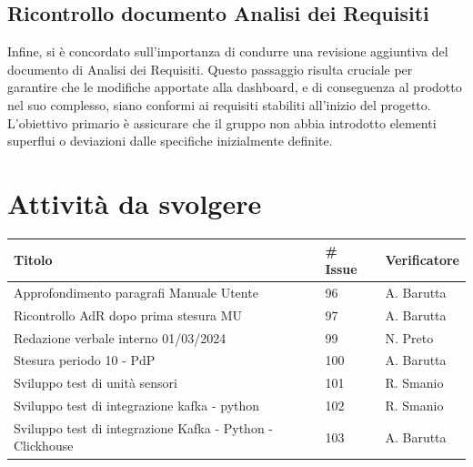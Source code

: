 \documentclass{article}
\begin{document}
    \subsection{Ricontrollo documento Analisi dei Requisiti}
    Infine, si è concordato sull'importanza di condurre una revisione aggiuntiva del documento di Analisi dei Requisiti. Questo passaggio risulta cruciale per garantire che le modifiche apportate alla dashboard, e di conseguenza al prodotto nel suo complesso, siano conformi ai requisiti stabiliti all'inizio del progetto. L'obiettivo primario è assicurare che il gruppo non abbia introdotto elementi superflui o deviazioni dalle specifiche inizialmente definite.

    \section{Attività da svolgere}
    \begin{center}
        \begin{tabular}{|C{7cm}|C{1,5cm}|C{3cm}|}
            \hline
            \textbf{Titolo} & \textbf{\# Issue} & \textbf{Verificatore} \\
            \hline
            \hline
            Approfondimento paragrafi Manuale Utente & 96 & A. Barutta \\
            \hline
            Ricontrollo AdR dopo prima stesura MU & 97 & A. Barutta \\
            \hline
            Redazione verbale interno 01/03/2024 & 99 & N. Preto \\
            \hline
            Stesura periodo 10 - PdP & 100 & A. Barutta \\
            \hline
            Sviluppo test di unità sensori & 101 & R. Smanio \\
            \hline
            Sviluppo test di integrazione kafka - python & 102 & R. Smanio \\
            \hline
            Sviluppo test di integrazione Kafka - Python - Clickhouse & 103 & A. Barutta \\
            \hline
        \end{tabular}
    \end{center}
\end{document}
